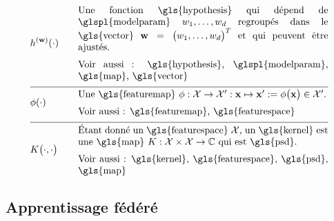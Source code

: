 \begin{align}
	& \hypothesis^{(\weights)}(\cdot) & \quad & \parbox{.75\textwidth}{
	Une fonction \gls{hypothesis} qui dépend de \glspl{modelparam} $\weight_{1},\ldots,\weight_{\featuredim}$ regroupés dans le \gls{vector} $\weights=\big(\weight_{1},\ldots,\weight_{\featuredim} \big)^{T}$ et qui peuvent être ajustés. \\
	[2mm] Voir aussi : \gls{hypothesis}, \glspl{modelparam}, \gls{map}, \gls{vector}
	} \nonumber \\[2mm] \hline \nonumber\\[-5mm]
	& \featuremap(\cdot) & \quad & \parbox{.75\textwidth}{
		Une \gls{featuremap} $\featuremap: \featurespace \rightarrow \featurespace' : \featurevec \mapsto \featurevec' \defeq \featuremap\big( \featurevec \big) \in \featurespace'$. \\
		[2mm] Voir aussi : \gls{featuremap}, \gls{featurespace}
	} \nonumber \\[2mm] \hline \nonumber\\[-5mm]
	& \kernelmap{\cdot}{\cdot} & \quad & \parbox{.75\textwidth}{
		Étant donné un \gls{featurespace} $\featurespace$, un \gls{kernel} est une \gls{map} $\kernel: \featurespace \times \featurespace \rightarrow \mathbb{C}$ qui est \gls{psd}. \\
		[2mm] Voir aussi : \gls{kernel}, \gls{featurespace}, \gls{psd}, \gls{map}
	} \nonumber
\end{align}
            

\newpage
\subsection*{Apprentissage fédéré}


